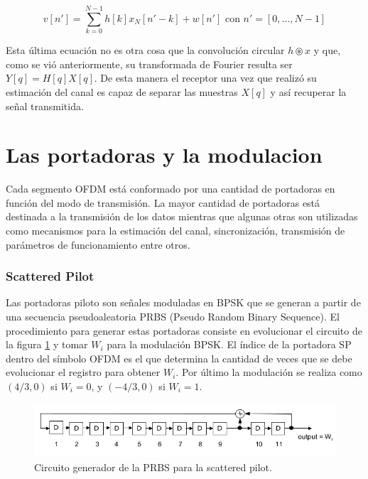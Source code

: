 \begin{equation}
v[n'] = \sum_{k = 0}^{N-1}h[k]x_N[n'- k] + w[n'] \text{ con } n' = [0, ..., N-1]
\end{equation}

Esta última ecuación no es otra cosa que la convolución circular $h \circledast x$ y que, como se vió anteriormente, su transformada de Fourier resulta ser $Y[q] = H[q]X[q]$.
De esta manera el receptor una vez que realizó su estimación del canal es capaz de separar las muestras $X[q]$ y así recuperar la señal transmitida.

\section{Las portadoras y la modulacion}

Cada segmento OFDM está conformado por una cantidad de portadoras en función del modo de transmisión. La mayor cantidad de portadoras está destinada a la transmisión de los datos mientras que algunas otras son utilizadas como mecanismos para la estimación del canal, sincronización, transmisión de parámetros de funcionamiento entre otros.



\subsubsection{Scattered Pilot}
Las portadoras piloto son señales moduladas en BPSK que se generan a partir de una secuencia pseudoaleatoria \gls{PRBS} (Pseudo Random Binary Sequence). El procedimiento para generar estas portadoras consiste en evolucionar el circuito de la figura \ref{f:prbs} y tomar $W_i$ para la modulación BPSK. El índice de la portadora \gls{SP} dentro del símbolo OFDM es el que determina la cantidad de veces que se debe evolucionar el registro para obtener $W_i$.
Por último la modulación se realiza como $(4/3, 0)$ si $W_i = 0$, y $(-4/3, 0)$ si $W_i = 1$.

\begin{figure}[h!]
	\centering
	\includegraphics[scale=0.55]{figuras/cap03/circuito_prbs}
	\caption{\label{f:prbs} Circuito generador de la PRBS para la scattered pilot.}
\end{figure}

